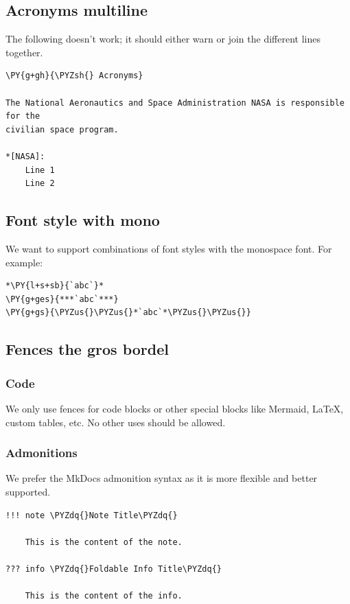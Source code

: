 \documentclass[a4paper,twoside]{article}
\begin{document}
\subsection{Acronyms multiline}
The following doesn't work; it should either warn or join the different lines together.
\begin{tscode}[lang=markdown, engine=pygments]
\begin{Verbatim}[commandchars=\\\{\},breaklines, breakanywhere, commandchars=\\\{\}]
\PY{g+gh}{\PYZsh{} Acronyms}

The National Aeronautics and Space Administration NASA is responsible for the
civilian space program.

*[NASA]:
    Line 1
    Line 2
\end{Verbatim}
\end{tscode}
\subsection{Font style with mono}
We want to support combinations of font styles with the monospace font. For example:
\begin{tscode}[lang=markdown, engine=pygments]
\begin{Verbatim}[commandchars=\\\{\},breaklines, breakanywhere, commandchars=\\\{\}]
*\PY{l+s+sb}{`abc`}*
\PY{g+ges}{***`abc`***}
\PY{g+gs}{\PYZus{}\PYZus{}*`abc`*\PYZus{}\PYZus{}}
\end{Verbatim}
\end{tscode}
\subsection{Fences the gros bordel}
\subsubsection{Code}
We only use  fences for code blocks or other special blocks like Mermaid, \LaTeX{}, custom tables, etc. No other uses should be allowed.
\subsubsection{Admonitions}
We prefer the MkDocs admonition syntax as it is more flexible and better supported.
\begin{tscode}[lang=md, engine=pygments]
\begin{Verbatim}[commandchars=\\\{\},breaklines, breakanywhere, commandchars=\\\{\}]
!!! note \PYZdq{}Note Title\PYZdq{}

    This is the content of the note.

??? info \PYZdq{}Foldable Info Title\PYZdq{}

    This is the content of the info.
\end{Verbatim}
\end{tscode}
\end{document}
